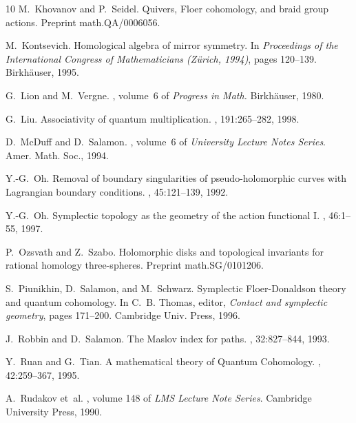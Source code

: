 \documentclass[10pt,letterpaper]{article}
\begin{document}
\begin{thebibliography}{10}
M.~Khovanov and P.~Seidel.
\newblock Quivers, {F}loer cohomology, and braid group actions.
\newblock Preprint math.QA/0006056.

M.~Kontsevich.
\newblock Homological algebra of mirror symmetry.
\newblock In {\em Proceedings of the International Congress of Mathematicians
  (Z{\"u}rich, 1994)}, pages 120--139. Birkh{\"a}user, 1995.

G.~Lion and M.~Vergne.
,
  volume~6 of {\em Progress in Math.}
\newblock Birkh{\"a}user, 1980.

G.~Liu.
\newblock Associativity of quantum multiplication.
, 191:265--282, 1998.

D.~McDuff and D.~Salamon.
, volume~6 of
  {\em University Lecture Notes Series}.
\newblock Amer. Math. Soc., 1994.

Y.-G.~Oh.
\newblock Removal of boundary singularities of pseudo-holomorphic
curves with {L}agrangian boundary conditions.
, 45:121--139, 1992.

Y.-G.~Oh.
\newblock Symplectic topology as the geometry of the action functional {I}.
, 46:1--55, 1997.

P.~Ozsvath and Z.~Szabo.
\newblock Holomorphic disks and topological invariants for rational homology
  three-spheres.
\newblock Preprint math.SG/0101206.

S.~Piunikhin, D.~Salamon, and M.~Schwarz.
\newblock Symplectic {F}loer-{D}onaldson theory and quantum cohomology.
\newblock In C.~B. Thomas, editor, {\em Contact and symplectic geometry}, pages
  171--200. Cambridge Univ. Press, 1996.

J.~Robbin and D.~Salamon.
\newblock The {M}aslov index for paths.
, 32:827--844, 1993.

Y.~Ruan and G.~Tian.
\newblock A mathematical theory of {Q}uantum {C}ohomology.
, 42:259--367, 1995.

A.~Rudakov et~al.
, volume 148
  of {\em LMS Lecture Note Series}.
\newblock Cambridge University Press, 1990.


\end{thebibliography}
\end{document}
